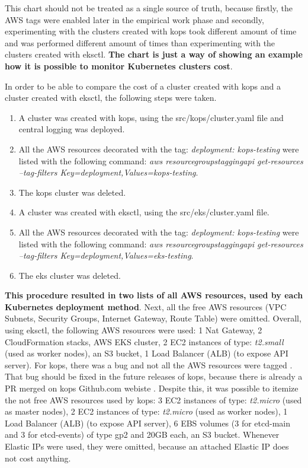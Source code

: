 This chart should not be treated as a single source of truth, because firstly, the AWS tags were enabled later in the empirical work phase and secondly, experimenting with the clusters created with kops took different amount of time and was performed different amount of times than experimenting with the clusters created with eksctl. \textbf{The chart is just a way of showing an example how it is possible to monitor Kubernetes clusters cost}.

In order to be able to compare the cost of a cluster created with kops and a cluster created with eksctl, the following steps were taken.
\begin{enumerate}
\item A cluster was created with kops, using the src/kops/cluster.yaml file and central logging was deployed.
\item All the AWS resources decorated with the tag: \textit{deployment: kops-testing} were listed with the following command: \textit{aws resourcegroupstaggingapi get-resources --tag-filters Key=deployment,Values=kops-testing}.
\item The kops cluster was deleted.
\item A cluster was created with eksctl, using the src/eks/cluster.yaml file.
\item All the AWS resources decorated with the tag: \textit{deployment: kops-testing} were listed with the following command: \textit{aws resourcegroupstaggingapi get-resources --tag-filters Key=deployment,Values=eks-testing}.
\item The eks cluster was deleted.
\end{enumerate}

\textbf{This procedure resulted in two lists of all AWS resources, used by each Kubernetes deployment method}. Next, all the free AWS resources (VPC Subnets, Security Groups, Internet Gateway, Route Table) were omitted. Overall, using eksctl, the following AWS resources were used: 1 Nat Gateway, 2 CloudFormation stacks, AWS EKS cluster, 2 EC2 instances of type: \textit{t2.small} (used as worker nodes), an S3 bucket, 1 Load Balancer (ALB) (to expose API server). For kops, there was a bug and not all the AWS resources were tagged \cite{kops-issue-tags}. That bug should be fixed in the future releases of kops, because there is already a PR merged on kops Github.com webiste \cite{kops-issue-tags-pr}. Despite this, it was possible to itemize the not free AWS resources used by kops: 3 EC2 instances of type: \textit{t2.micro} (used as master nodes), 2 EC2 instances of type: \textit{t2.micro} (used as worker nodes), 1 Load Balancer (ALB) (to expose API server), 6 EBS volumes (3 for etcd-main and 3 for etcd-events) of type gp2 and 20GB each, an S3 bucket. Whenever Elastic IPs were used, they were omitted, because an attached Elastic IP does not cost anything.

